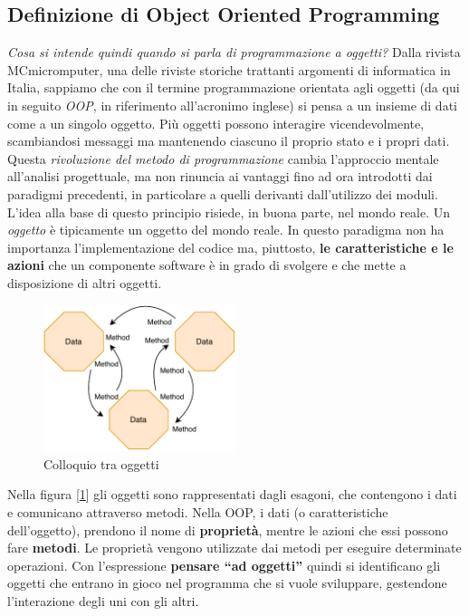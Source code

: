 \subsection{Definizione di Object Oriented Programming}
\textit{Cosa si intende quindi quando si parla di programmazione a oggetti?} Dalla rivista MCmicromputer, una delle riviste storiche trattanti argomenti di informatica in Italia, sappiamo che con il termine programmazione orientata agli oggetti (da qui in seguito \textit{OOP}, in riferimento all'acronimo inglese) si pensa a un insieme di dati come a un singolo oggetto. \cite{mcmicrocomputer:oop} Più oggetti possono interagire vicendevolmente, scambiandosi messaggi ma mantenendo ciascuno il proprio stato e i propri dati. Questa \textit{rivoluzione del metodo di programmazione} cambia l'approccio mentale all'analisi progettuale, ma non rinuncia ai vantaggi fino ad ora introdotti dai paradigmi precedenti, in particolare a quelli derivanti dall'utilizzo dei moduli. L’idea alla base di questo principio risiede, in buona parte, nel mondo reale. Un \textit{oggetto} è tipicamente un oggetto del mondo reale. In questo paradigma non ha importanza l'implementazione del codice ma, piuttosto, \textbf{le caratteristiche e le azioni} che un componente software è in grado di svolgere e che mette a disposizione di altri oggetti.  
\begin{figure}[H]
    \centering
    \includegraphics[width=0.50\textwidth]{images/01_4_object_oriented_programming.pdf}
    \caption{Colloquio tra oggetti}
    \label{fig:objectoriented-programming}
\end{figure}
Nella figura [\ref{fig:objectoriented-programming}] gli oggetti sono rappresentati dagli esagoni, che contengono i dati e comunicano attraverso metodi. Nella OOP, i dati (o caratteristiche dell'oggetto), prendono il nome di \textbf{proprietà}, mentre le azioni che essi possono fare \textbf{metodi}. Le proprietà vengono utilizzate dai metodi per eseguire determinate operazioni. Con l'espressione \textbf{pensare “ad oggetti”} quindi si identificano gli oggetti che entrano in gioco nel programma che si vuole sviluppare, gestendone l’interazione degli uni con gli altri.

